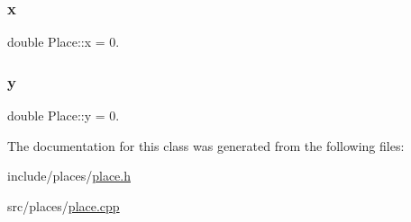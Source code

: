 \mbox{\label{classPlace_ac6d563401f03901268237a3eac6c5a91}} 
\subsubsection{\texorpdfstring{x}{x}}
{\footnotesize\ttfamily double Place\+::x = 0.\hspace{0.3cm}{\ttfamily [protected]}}

\mbox{\label{classPlace_aa2db7a2794804023e6e4b239d2583e26}} 
\subsubsection{\texorpdfstring{y}{y}}
{\footnotesize\ttfamily double Place\+::y = 0.\hspace{0.3cm}{\ttfamily [protected]}}



The documentation for this class was generated from the following files\+:\begin{DoxyCompactItemize}
\item 
include/places/\hyperlink{place_8h}{place.\+h}\item 
src/places/\hyperlink{place_8cpp}{place.\+cpp}\end{DoxyCompactItemize}
